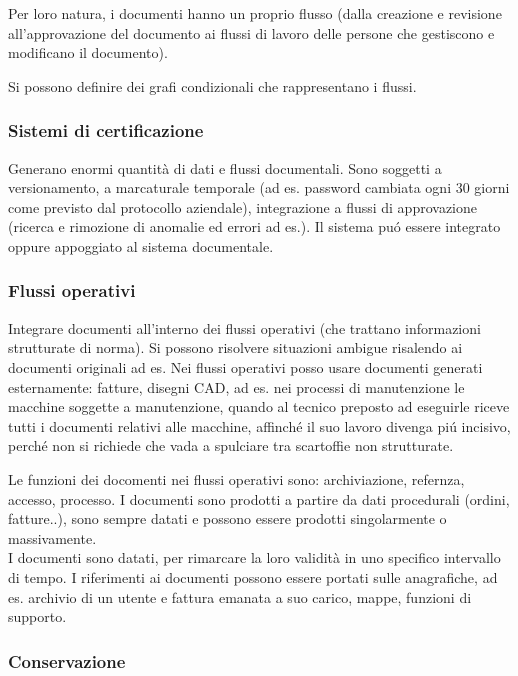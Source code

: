 Per loro natura, i documenti hanno un proprio flusso (dalla creazione e
revisione all'approvazione del documento ai flussi di lavoro delle
persone che gestiscono e modificano il documento).

Si possono definire dei grafi condizionali che rappresentano i flussi.

\subsubsection{Sistemi di
certificazione}

Generano enormi quantit\`a di dati e flussi documentali. Sono soggetti a
versionamento, a marcaturale temporale (ad es. password cambiata ogni 30
giorni come previsto dal protocollo aziendale), integrazione a flussi di
approvazione (ricerca e rimozione di anomalie ed errori ad es.). Il
sistema pu\'o essere integrato oppure appoggiato al sistema documentale.

\subsubsection{Flussi operativi}

Integrare documenti all'interno dei flussi operativi (che trattano
informazioni strutturate di norma). Si possono risolvere situazioni
ambigue risalendo ai documenti originali ad es. Nei flussi operativi
posso usare documenti generati esternamente: fatture, disegni CAD, ad
es. nei processi di manutenzione le macchine soggette a manutenzione,
quando al tecnico preposto ad eseguirle riceve tutti i documenti
relativi alle macchine, affinch\'e il suo lavoro divenga pi\'u incisivo,
perch\'e non si richiede che vada a spulciare tra scartoffie non
strutturate.

Le funzioni dei docomenti nei flussi operativi sono: archiviazione,
refernza, accesso, processo. I documenti sono prodotti a partire da dati
procedurali (ordini, fatture..), sono sempre datati e possono essere
prodotti singolarmente o massivamente.\\
I documenti sono datati, per rimarcare la loro validit\`a in uno specifico
intervallo di tempo. I riferimenti ai documenti possono essere portati
sulle anagrafiche, ad es. archivio di un utente e fattura emanata a suo
carico, mappe, funzioni di supporto.

\subsubsection{Conservazione}

